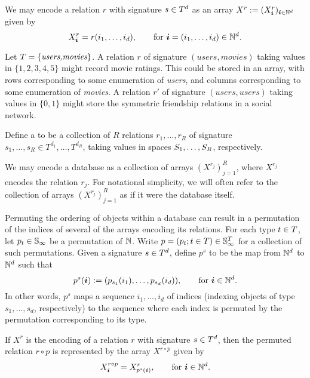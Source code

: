 We may encode a relation $r$ with signature $s \in T^d$ as an array $X^r := (X^r_{\bm{i}})_{\bm{i} \in \mathbb{N}^d}$ given by
\[
X^r_{\bm{i}} = r(i_1,\dotsc,i_d), \qquad \text{for } \bm{i} = (i_1,\dotsc, i_d) \in \mathbb{N}^d.
\]

\begin{example} 
Let $T = \{\textit{users,movies}\}$.
A relation $r$ of signature $(\textit{users},\textit{movies})$ taking values in $\{1,2,3,4,5\}$ might record movie ratings.
This could be stored in an array, with rows corresponding to some enumeration of \textit{users}, and columns corresponding to some enumeration of \textit{movies}. 
A relation $r'$ of signature $(\textit{users},\textit{users})$ taking values in $\{0,1\}$ might store the symmetric friendship relations in a social network.
\end{example}

\begin{definition}[database]
Define a  to be a collection of $R$ relations $r_1,\dotsc,r_R$ of signature $s_1,\dotsc,s_R \in T^{d_1},\dotsc,T^{d_R}$, taking values in spaces $S_1,\dotsc,S_R$, respectively.
\end{definition}

We may encode a database as a collection of arrays $(X^{r_j})_{j=1}^R$, where $X^{r_j}$ encodes the relation $r_j$.  
For notational simplicity, we will often refer to the collection of arrays $(X^{r_j})_{j=1}^R$ as if it were the database itself.

Permuting the ordering of objects within a database can result in a permutation of the indices of several of the arrays encoding its relations.
For each type $t \in T$, let $p_t \in \mathbb{S}_{\infty}$ be a permutation of $\mathbb{N}$. 
Write $p = (p_t ; t \in T) \in \mathbb{S}_{\infty}^T$ for a collection of such permutations.
Given a signature $s \in T^{d}$, define $p^s$ to be the map from $\mathbb{N}^{d}$ to $\mathbb{N}^{d}$ such that
\[
p^s(\bm{i}) := (p_{s_1}(i_1), \dotsc,p_{s_{d}}(i_{d})), \qquad \text{for } \bm{i} \in \mathbb{N}^{d}.
\]
In other words, $p^s$ maps a sequence $i_1,\dotsc,i_d$ of indices (indexing objects of type $s_1,\dotsc,s_d$, respectively) to the sequence where each index is permuted by the permutation corresponding to its type.

If $X^r$ is the encoding of a relation $r$ with signature $s \in T^d$, then the permuted relation $r \circ p$ is represented by the array $X^{r\circ p}$ given by
\[
X^{r \circ p}_{\bm{i}} = X^r_{p^s(\bm{i})}, \qquad \text{for } \bm{i} \in \mathbb{N}^d.
\]

